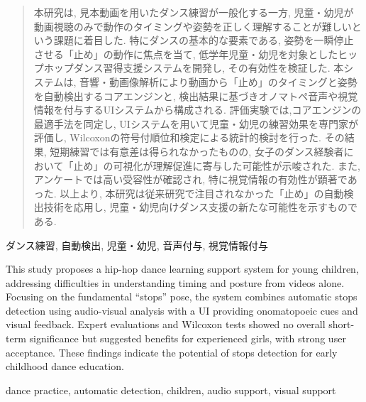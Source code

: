 \documentclass[paper]{ieicej}
\begin{document}
\begin{abstract}
    本研究は, 見本動画を用いたダンス練習が一般化する一方, 児童・幼児が動画視聴のみで動作のタイミングや姿勢を正しく理解することが難しいという課題に着目した. 特にダンスの基本的な要素である, 姿勢を一瞬停止させる「止め」の動作に焦点を当て, 低学年児童・幼児を対象としたヒップホップダンス習得支援システムを開発し, その有効性を検証した. 本システムは, 音響・動画像解析により動画から「止め」のタイミングと姿勢を自動検出するコアエンジンと, 検出結果に基づきオノマトペ音声や視覚情報を付与するUIシステムから構成される. 評価実験では,コアエンジンの最適手法を同定し, UIシステムを用いて児童・幼児の練習効果を専門家が評価し, Wilcoxonの符号付順位和検定による統計的検討を行った. その結果, 短期練習では有意差は得られなかったものの, 女子のダンス経験者において「止め」の可視化が理解促進に寄与した可能性が示唆された. また, アンケートでは高い受容性が確認され, 特に視覚情報の有効性が顕著であった. 以上より, 本研究は従来研究で注目されなかった「止め」の自動検出技術を応用し, 児童・幼児向けダンス支援の新たな可能性を示すものである. 
\end{abstract}
\begin{keyword}
    ダンス練習, 自動検出, 児童・幼児, 音声付与, 視覚情報付与
\end{keyword}
\begin{eabstract}
    This study proposes a hip-hop dance learning support system for young children, addressing difficulties in understanding timing and posture from videos alone. Focusing on the fundamental “stops” pose, the system combines automatic stops detection using audio-visual analysis with a UI providing onomatopoeic cues and visual feedback. Expert evaluations and Wilcoxon tests showed no overall short-term significance but suggested benefits for experienced girls, with strong user acceptance. These findings indicate the potential of stops detection for early childhood dance education.
\end{eabstract}
\begin{ekeyword}
    dance practice, automatic detection, children, audio support, visual support
\end{ekeyword}
\maketitle
\end{document}
